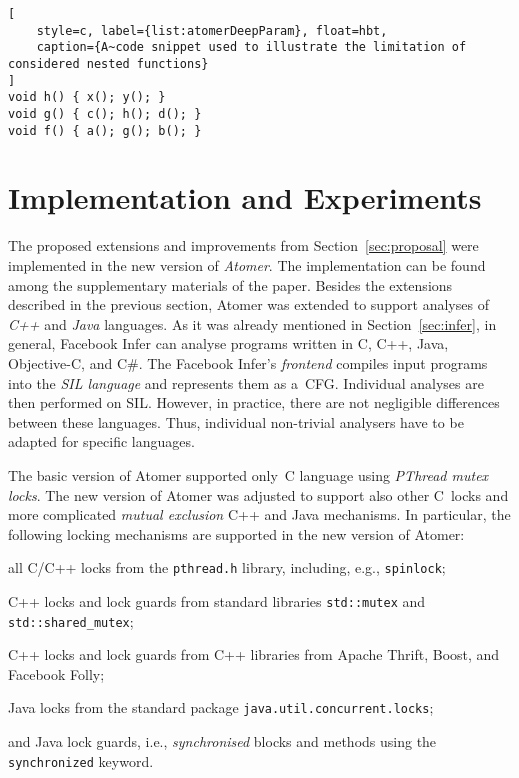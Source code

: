 \documentclass{ExcelAtFIT}
\theoremstyle{definition}
\begin{document}
\begin{lstlisting}[
    style=c, label={list:atomerDeepParam}, float=hbt,
    caption={A~code snippet used to illustrate the limitation of considered nested functions}
]
void h() { x(); y(); }
void g() { c(); h(); d(); }
void f() { a(); g(); b(); }
\end{lstlisting}


\section{Implementation and Experiments}
\label{sec:exp}

The proposed extensions and improvements from Section~\ref{sec:proposal} were implemented in the new version of \emph{Atomer}. The implementation can be found among the supplementary materials of the paper. Besides the extensions described in the previous section, Atomer was extended to support analyses of \emph{C++} and \emph{Java} languages. As it was already mentioned in Section~\ref{sec:infer}, in general, Facebook Infer can analyse programs written in C, C++, Java, Objective-C, and C\#. The Facebook Infer's \emph{frontend} compiles input programs into the \emph{SIL language} and represents them as a~CFG. Individual analyses are then performed on SIL. However, in practice, there are not negligible differences between these languages. Thus, individual non-trivial analysers have to be adapted for specific languages.

The basic version of Atomer supported only~C language using \emph{PThread mutex locks}. The new version of Atomer was adjusted to support also other C~locks and more complicated \emph{mutual exclusion} C++ and Java mechanisms. In particular, the following locking mechanisms are supported in the new version of Atomer:
\begin{enuminline}
    \item all C/C++ locks from the \texttt{pthread.h} library, including, e.g., \texttt{spinlock};

    \item C++ locks and lock guards from standard libraries \texttt{std::mutex} and \texttt{std::shared\_mutex};
    
    \item C++ locks and lock guards from C++ libraries from Apache Thrift, Boost, and Facebook Folly;
    
    \item Java locks from the standard package \texttt{java.util.concurrent.locks};
    
    \item and Java lock guards, i.e., \emph{synchronised} blocks and methods using the \texttt{synchronized} keyword.
\end{enuminline}
\end{document}
